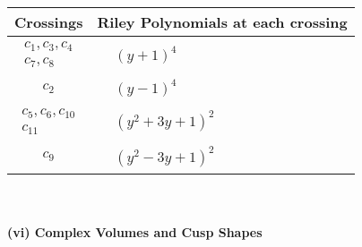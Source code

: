 \documentclass[1p]{elsarticle_modified}
\theoremstyle{definition}
\begin{document}
\begin{tabular}{m{50pt}|m{274pt}}
Crossings & \hspace{64pt}Riley Polynomials at each crossing \\
\hline $$\begin{aligned}c_{1},c_{3},c_{4}\\c_{7},c_{8}\end{aligned}$$&$\begin{aligned}
&(y+1)^4
\end{aligned}$\\
\hline $$\begin{aligned}c_{2}\end{aligned}$$&$\begin{aligned}
&(y-1)^4
\end{aligned}$\\
\hline $$\begin{aligned}c_{5},c_{6},c_{10}\\c_{11}\end{aligned}$$&$\begin{aligned}
&(y^2+3 y+1)^2
\end{aligned}$\\
\hline $$\begin{aligned}c_{9}\end{aligned}$$&$\begin{aligned}
&(y^2-3 y+1)^2
\end{aligned}$\\
\hline
\end{tabular}\\~\\
\newpage\flushleft \textbf{(vi) Complex Volumes and Cusp Shapes}
\end{document}
